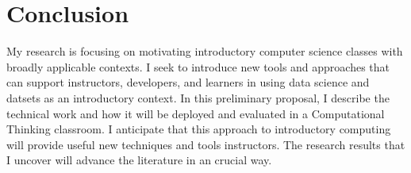 \section{Conclusion}

My research is focusing on motivating introductory computer science classes with broadly applicable contexts.
I seek to introduce new tools and approaches that can support instructors, developers, and learners in using data science and datsets as an introductory context.
In this preliminary proposal, I describe the technical work and how it will be deployed and evaluated in a Computational Thinking classroom.
I anticipate that this approach to introductory computing will provide useful new techniques and tools instructors.
The research results that I uncover will advance the literature in an crucial way.